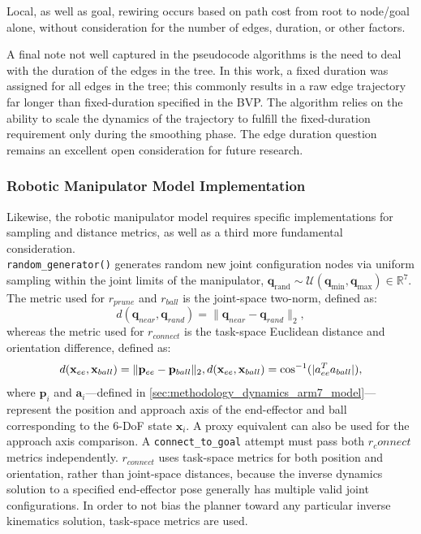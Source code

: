 Local, as well as goal, rewiring occurs based on path cost from root to node/goal alone, without consideration for the number of edges, duration, or other factors.

A final note not well captured in the pseudocode algorithms is the need to deal with the duration of the edges in the tree.
In this work, a fixed duration was assigned for all edges in the tree; this commonly results in a raw edge trajectory far longer than fixed-duration specified in the \ac{BVP}.
The algorithm relies on the ability to scale the dynamics of the trajectory to fulfill the fixed-duration requirement only during the smoothing phase.
The edge duration question remains an excellent open consideration for future research.

\subsubsection{Robotic Manipulator Model Implementation}
Likewise, the robotic manipulator model requires specific implementations for sampling and distance metrics, as well as a third more fundamental consideration.\\
\texttt{random\_generator()} generates random new joint configuration nodes via uniform sampling within the joint limits of the manipulator, $\mathbf{q}_{\text{rand}} \sim \mathcal{U}\left(\mathbf{q}_{\min}, \mathbf{q}_{\max}\right) \in \mathbb{R}^7$.
The metric used for $r_{prune}$ and $r_{ball}$ is the joint-space two-norm, defined as:
\begin{equation}
    d(\mathbf{q}_{near}, \mathbf{q}_{rand}) = \|\mathbf{q}_{near} - \mathbf{q}_{rand}\|_2,
\end{equation}
whereas the metric used for $r_{connect}$ is the task-space Euclidean distance and orientation difference, defined as:
\begin{equation}
    d(\mathbf{x}_{ee}, \mathbf{x}_{ball}) = \|\mathbf{p}_{ee} - \mathbf{p}_{ball}\|_2, \\
    d(\mathbf{x}_{ee}, \mathbf{x}_{ball}) = \cos^{-1}(|a_{ee}^T a_{ball}|),
\end{equation}
where $\mathbf{p}_i$ and $\mathbf{a}_i$---defined in \cref{sec:methodology_dynamics_arm7_model}---represent the position and approach axis of the end-effector and ball corresponding to the 6-DoF state $\mathbf{x}_i$. 
A proxy equivalent can also be used for the approach axis comparison. 
A \texttt{connect\_to\_goal} attempt must pass both $r_connect$ metrics independently.
$r_{connect}$ uses task-space metrics for both position and orientation, rather than joint-space distances, because the inverse dynamics solution to a specified end-effector pose generally has multiple valid joint configurations.
In order to not bias the planner toward any particular inverse kinematics solution, task-space metrics are used.

